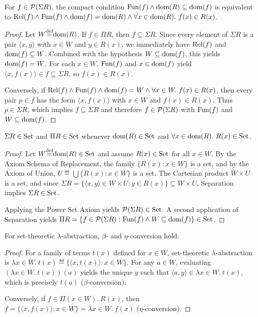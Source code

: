 \documentclass[10pt,a4paper]{article}
\begin{document}
\begin{theorem}
For $f \in {\mathcal{P}}(\Sigma R)$, the compact condition ${\textrm{Fun}}(f) \land {\textrm{dom}}(R) \subseteq {\textrm{dom}}(f)$ is equivalent to ${\textrm{Rel}}(f) \land {\textrm{Fun}}(f) \land {\textrm{dom}}(f) = {\textrm{dom}}(R) \land \forall x \in {\textrm{dom}}(R).\ f(x) \in R(x)$.
\end{theorem}
\begin{proof}
Let $W {\stackrel{{\textrm{def}}}{=}} {\textrm{dom}}(R)$. If $f \in \Pi R$, then $f \subseteq \Sigma R$. Since every element of $\Sigma R$ is a pair $\langle x, y \rangle$ with $x \in W$ and $y \in R(x)$, we immediately have ${\textrm{Rel}}(f)$ and ${\textrm{dom}}(f) \subseteq W$. Combined with the hypothesis $W \subseteq {\textrm{dom}}(f)$, this yields ${\textrm{dom}}(f) = W$. For each $x \in W$, ${\textrm{Fun}}(f)$ and $x \in {\textrm{dom}}(f)$ yield $\langle x, f(x) \rangle \in f \subseteq \Sigma R$, so $f(x) \in R(x)$.

Conversely, if ${\textrm{Rel}}(f) \land {\textrm{Fun}}(f) \land {\textrm{dom}}(f) = W \land \forall x \in W.\ f(x) \in R(x)$, then every pair $p \in f$ has the form $\langle x, f(x) \rangle$ with $x \in W$ and $f(x) \in R(x)$. Thus $p \in \Sigma R$, which implies $f \subseteq \Sigma R$ and therefore $f \in {\mathcal{P}}(\Sigma R)$ with ${\textrm{Fun}}(f)$ and $W \subseteq {\textrm{dom}}(f)$.
\end{proof}
\begin{theorem}
$\Sigma R \in {\textrm{Set}}$ and $\Pi R \in {\textrm{Set}}$ whenever ${\textrm{dom}}(R) \in {\textrm{Set}}$ and $\forall x \in {\textrm{dom}}(R).\ R(x) \in {\textrm{Set}}$.
\end{theorem}
\begin{proof}
Let $W {\stackrel{{\textrm{def}}}{=}} {\textrm{dom}}(R) \in {\textrm{Set}}$ and assume $R(x) \in {\textrm{Set}}$ for all $x \in W$. By the Axiom Schema of Replacement, the family $\{R(x) : x \in W\}$ is a set, and by the Axiom of Union, $U \eqdef \bigcup \{R(x) : x \in W\}$ is a set. The Cartesian product $W \times U$ is a set, and since $\Sigma R = \{\langle x, y \rangle \in W \times U : y \in R(x)\} \subseteq W \times U$, Separation implies $\Sigma R \in {\textrm{Set}}$.

Applying the Power Set Axiom yields ${\mathcal{P}}(\Sigma R) \in {\textrm{Set}}$. A second application of Separation yields $\Pi R = \{f \in {\mathcal{P}}(\Sigma R) : {\textrm{Fun}}(f) \land W \subseteq {\textrm{dom}}(f)\} \in {\textrm{Set}}$.
\end{proof}
\begin{theorem}
For set-theoretic $\lambda$-abstraction, $\beta$- and $\eta$-conversion hold.
\end{theorem}
\begin{proof}
For a family of terms $t(x)$ defined for $x \in W$, set-theoretic $\lambda$-abstraction is $\lambda x \in W.\ t(x) \eqdef \{\langle x, t(x) \rangle : x \in W\}$. For any $a \in W$, evaluating $(\lambda x \in W.\ t(x))(a)$ yields the unique $y$ such that $\langle a, y \rangle \in \lambda x \in W.\ t(x)$, which is precisely $t(a)$ ($\beta$-conversion).

Conversely, if $f \in \Pi(x \in W).\ R(x)$, then $f = \{\langle x, f(x) \rangle : x \in W\} = \lambda x \in W.\ f(x)$ ($\eta$-conversion).
\end{proof}\label{sec:logic_set}
\end{document}
